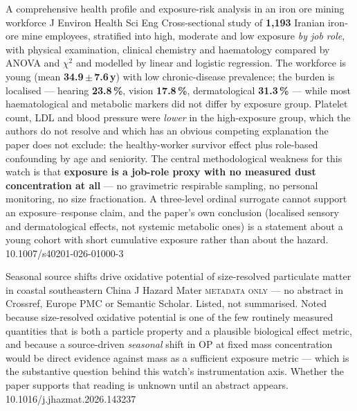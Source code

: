 \documentclass[10pt]{article}
\begin{document}
{A comprehensive health profile and exposure-risk analysis in an iron ore mining workforce}
{J Environ Health Sci Eng}
{Cross-sectional study of \textbf{1,193} Iranian iron-ore mine employees, stratified into
high, moderate and low exposure \emph{by job role}, with physical examination, clinical
chemistry and haematology compared by ANOVA and $\chi^2$ and modelled by linear and
logistic regression. The workforce is young (mean \textbf{34.9\,$\pm$\,7.6\,y}) with low
chronic-disease prevalence; the burden is localised --- hearing \textbf{23.8\,\%}, vision
\textbf{17.8\,\%}, dermatological \textbf{31.3\,\%} --- while most haematological and
metabolic markers did not differ by exposure group. Platelet count, LDL and blood
pressure were \emph{lower} in the high-exposure group, which the authors do not resolve
and which has an obvious competing explanation the paper does not exclude: the
healthy-worker survivor effect plus role-based confounding by age and seniority. The
central methodological weakness for this watch is that \textbf{exposure is a job-role
proxy with no measured dust concentration at all} --- no gravimetric respirable sampling,
no personal monitoring, no size fractionation. A three-level ordinal surrogate cannot
support an exposure--response claim, and the paper's own conclusion (localised sensory and
dermatological effects, not systemic metabolic ones) is a statement about a young cohort
with short cumulative exposure rather than about the hazard.}
{10.1007/s40201-026-01000-3}


{Seasonal source shifts drive oxidative potential of size-resolved particulate matter in coastal southeastern China}
{J Hazard Mater}
{\textsc{metadata only} --- no abstract in Crossref, Europe PMC or Semantic Scholar.
Listed, not summarised. Noted because size-resolved oxidative potential is one of the few
routinely measured quantities that is both a particle property and a plausible biological
effect metric, and because a source-driven \emph{seasonal} shift in OP at fixed mass
concentration would be direct evidence against mass as a sufficient exposure metric ---
which is the substantive question behind this watch's instrumentation axis. Whether the
paper supports that reading is unknown until an abstract appears.}
{10.1016/j.jhazmat.2026.143237}

\end{document}

